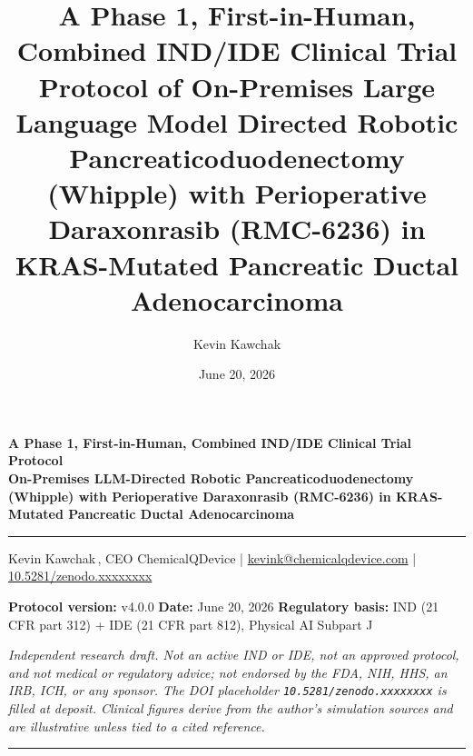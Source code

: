 \documentclass[11pt]{article}
\title{A Phase 1, First-in-Human, Combined IND/IDE Clinical Trial Protocol of
On-Premises Large Language Model Directed Robotic Pancreaticoduodenectomy
(Whipple) with Perioperative Daraxonrasib (RMC-6236) in KRAS-Mutated Pancreatic
Ductal Adenocarcinoma}
\author{Kevin Kawchak}
\date{June 20, 2026}
\begin{document}
\thispagestyle{plain}

\begin{center}
{\LARGE\bfseries\color{accentcol} A Phase 1, First-in-Human, Combined IND/IDE
Clinical Trial Protocol}\\[0.4em]
{\large\bfseries On-Premises LLM-Directed Robotic Pancreaticoduodenectomy
(Whipple) with Perioperative Daraxonrasib (RMC-6236) in KRAS-Mutated Pancreatic
Ductal Adenocarcinoma}\\[0.3em]
{\color{accentcol}\rule{\linewidth}{1.2pt}}
\end{center}

\begin{center}\small
Kevin Kawchak\,, CEO ChemicalQDevice \;|\;
\href{mailto:kevink@chemicalqdevice.com}{kevink@chemicalqdevice.com} \;|\;
\href{https://doi.org/10.5281/zenodo.xxxxxxxx}{10.5281/zenodo.xxxxxxxx}
\end{center}

\begin{center}\footnotesize
\textbf{Protocol version:} v4.0.0 \quad
\textbf{Date:} June 20, 2026 \quad
\textbf{Regulatory basis:} IND (21 CFR part 312) + IDE (21 CFR part 812),
Physical AI Subpart J
\end{center}

\noindent\footnotesize\textit{Independent research draft. Not an active IND or
IDE, not an approved protocol, and not medical or regulatory advice; not endorsed
by the FDA, NIH, HHS, an IRB, ICH, or any sponsor. The DOI placeholder
\texttt{10.5281/zenodo.xxxxxxxx} is filled at deposit. Clinical figures derive
from the author's simulation sources and are illustrative unless tied to a cited
reference.}\normalsize\par

\renewcommand{\keywordname}{\textbf{Keywords}}

\vspace{0.4em}
{\color{accentcol}\rule{\linewidth}{0.6pt}}

\renewcommand{\contentsname}{\color{accentcol}Table of Contents}
{\setlength{\parskip}{0pt}\small\tableofcontents}
\clearpage

\clearpage
\clearpage
\clearpage
\clearpage
\clearpage
\clearpage
\clearpage
\clearpage
\clearpage
\clearpage
\clearpage
\clearpage

\end{document}
